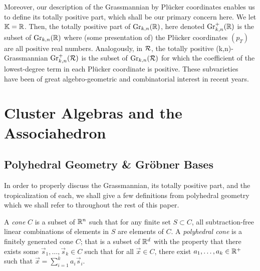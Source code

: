 \documentclass[12pt,letter]{article}
\newcommand{\gr}{\mathrm{Gr}}
\begin{document}
Moreover, our description of the Grassmannian by Pl\"ucker coordinates enables us to define its totally positive part, which shall be our primary concern here. We let ${\mathbb K}={\mathbb R}$. Then, the totally positive part of $\gr_{k,n} (\RR)$, here denoted $\gr_{k,n}^+(\RR)$ is the subset of $\gr_{k,n}(\RR)$ where (some presentation of) the Pl\"ucker coordinates $(p_T)$ are all positive real numbers. Analogously, in ${\mathcal R}$, the totally positive (k,n)-Grassmannian $\gr_{k,n}^+(\Rcal)$ is the subset of $\gr_{k,n}(\Rcal)$ for which the coefficient of the lowest-degree term in each Pl\"ucker coordinate is positive. These subvarieties~ have been of great algebro-geometric and combinatorial interest in recent years.
\section{Cluster Algebras and the Associahedron}
\subsection{Polyhedral Geometry \& Gr\"obner Bases}
In order to properly discuss the Grassmannian, its totally positive part, and the tropicalization of each, we shall give a few definitions from polyhedral geometry which we shall refer to throughout the rest of this paper.

\begin{definition}
A \emph{cone} $C$ is a subset of ${\mathbb R}^n$ such that for any finite set $S\subset  C$, all subtraction-free linear combinations of elements in $S$ are elements of $C$. A \emph{polyhedral cone} is a finitely generated cone $C$; that is a subset of ${\mathbb R}^d$ with the property that there exists some $\vec{s}_1,\hdots,\vec{s}_k\in C$ such that for all $\vec{x}\in C$, there exist $a_1,\hdots,a_k\in {\mathbb R}^+$ such that $\vec{x}=\sum_{i=1}^k a_i\vec{s}_i$. 
\end{definition}
\end{document}

